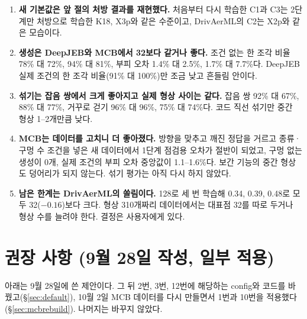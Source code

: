 \documentclass[11pt]{article}
\begin{document}
\begin{enumerate}
\item \textbf{새 기본값은 앞 절의 처방 결과를 재현했다.} 처음부터 다시 학습한 C1과 C3는 2단계만 처방으로 학습한 K18, X3p와 같은 수준이고, DrivAerML의 C2는 X2p와 같은 모습이다.
\item \textbf{생성은 DeepJEB와 MCB에서 32보다 같거나 좋다.} 조건 없는 한 조각 비율 78\% 대 72\%, 94\% 대 81\%, 부피 오차 1.4\% 대 2.5\%, 1.7\% 대 7.7\%다.
DeepJEB 실제 조건의 한 조각 비율(91\% 대 100\%)만 조금 낮고 흔들림 안이다.
\item \textbf{섞기는 잡음 쌍에서 크게 좋아지고 실제 형상 사이는 같다.} 잡음 쌍 92\% 대 67\%, 88\% 대 77\%, 거꾸로 걷기 96\% 대 96\%, 75\% 대 74\%다. 코드 직선 섞기만 중간 형상 1--2개만큼 낮다.
\item \textbf{MCB는 데이터를 고치니 더 좋아졌다.} 방향을 맞추고 깨진 정답을 거르고 종류·구멍 수 조건을 넣은 새 데이터에서 1단계 점검용 오차가 절반이 되었고,
구멍 없는 생성이 0개, 실제 조건의 부피 오차 중앙값이 1.1--1.6\%다. 보간 기능의 중간 형상도 덩어리가 되지 않는다. 섞기 평가는 아직 다시 하지 않았다.
\item \textbf{남은 한계는 DrivAerML의 쏠림이다.} 128로 세 번 학습해 0.34, 0.39, 0.48로 모두 32($-0.16$)보다 크다. 형상 310개짜리 데이터에서는 대표점 32를 따로 두거나 형상 수를 늘려야 한다.
결정은 사용자에게 있다.
\end{enumerate}

\section{권장 사항 (9월 28일 작성, 일부 적용)}
\label{sec:recommend}

아래는 9월 28일에 쓴 제안이다. 그 뒤 2번, 3번, 12번에 해당하는 config와 코드를 바꿨고(\S\ref{sec:default}), 10월 2일 MCB 데이터를 다시 만들면서 1번과 10번을 적용했다(\S\ref{sec:mcbrebuild}). 나머지는 바꾸지 않았다.
\end{document}
